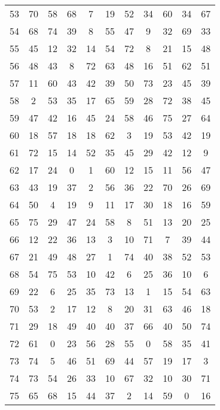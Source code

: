 \begin{table}
\begin{tabular}{c c c c c c c c c c c }
53 & 70 & 58 & 68 & 7 & 19 & 52 & 34 & 60 & 34 & 67 \\
54 & 68 & 74 & 39 & 8 & 55 & 47 & 9 & 32 & 69 & 33 \\
55 & 45 & 12 & 32 & 14 & 54 & 72 & 8 & 21 & 15 & 48 \\
56 & 48 & 43 & 8 & 72 & 63 & 48 & 16 & 51 & 62 & 51 \\
57 & 11 & 60 & 43 & 42 & 39 & 50 & 73 & 23 & 45 & 39 \\
58 & 2 & 53 & 35 & 17 & 65 & 59 & 28 & 72 & 38 & 45 \\
59 & 47 & 42 & 16 & 45 & 24 & 58 & 46 & 75 & 27 & 64 \\
60 & 18 & 57 & 18 & 18 & 62 & 3 & 19 & 53 & 42 & 19 \\
61 & 72 & 15 & 14 & 52 & 35 & 45 & 29 & 42 & 12 & 9 \\
62 & 17 & 24 & 0 & 1 & 60 & 12 & 15 & 11 & 56 & 47 \\
63 & 43 & 19 & 37 & 2 & 56 & 36 & 22 & 70 & 26 & 69 \\
64 & 50 & 4 & 19 & 9 & 11 & 17 & 30 & 18 & 16 & 59 \\
65 & 75 & 29 & 47 & 24 & 58 & 8 & 51 & 13 & 20 & 25 \\
66 & 12 & 22 & 36 & 13 & 3 & 10 & 71 & 7 & 39 & 44 \\
67 & 21 & 49 & 48 & 27 & 1 & 74 & 40 & 38 & 52 & 53 \\
68 & 54 & 75 & 53 & 10 & 42 & 6 & 25 & 36 & 10 & 6 \\
69 & 22 & 6 & 25 & 35 & 73 & 13 & 1 & 15 & 54 & 63 \\
70 & 53 & 2 & 17 & 12 & 8 & 20 & 31 & 63 & 46 & 18 \\
71 & 29 & 18 & 49 & 40 & 40 & 37 & 66 & 40 & 50 & 74 \\
72 & 61 & 0 & 23 & 56 & 28 & 55 & 0 & 58 & 35 & 41 \\
73 & 74 & 5 & 46 & 51 & 69 & 44 & 57 & 19 & 17 & 3 \\
74 & 73 & 54 & 26 & 33 & 10 & 67 & 32 & 10 & 30 & 71 \\
75 & 65 & 68 & 15 & 44 & 37 & 2 & 14 & 59 & 0 & 16 \\
\hline
\end{tabular}
\end{table}